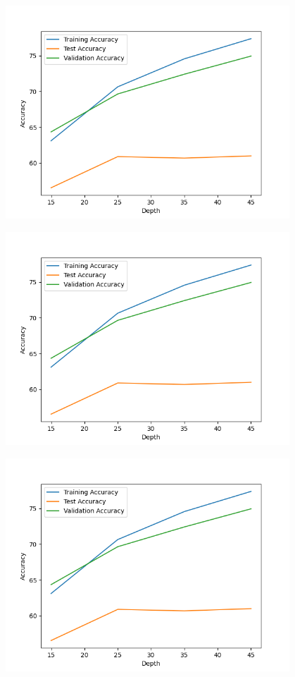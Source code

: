 \documentclass[12pt]{article}
\begin{document}
\begin{center}
    \includegraphics[width=0.8\textwidth]{Assignment 3/q1/(c)depth_vs_accuracy after pruning.png}
\end{center}

\begin{center}
    \includegraphics[width=0.8\textwidth]{Assignment 3/q1/(c)depth_vs_accuracy after pruning.png}
\end{center}

\begin{center}
    \includegraphics[width=0.8\textwidth]{Assignment 3/q1/(c)depth_vs_accuracy after pruning.png}
\end{center}
\end{document}
